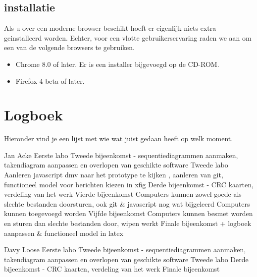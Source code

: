 \documentclass[a4paper,oneside]{report}
\begin{document}
\section{installatie}
Als u over een moderne browser beschikt hoeft er eigenlijk niets extra geinstalleerd worden.
Echter, voor een vlotte gebruikerservaring raden we aan om een van de volgende browsers te gebruiken.
\begin{itemize}
\item Chrome 8.0 of later. Er is een installer bijgevoegd op de CD-ROM.
\item Firefox 4 beta of later.
\end{itemize}


\chapter{Logboek}
Hieronder vind je een lijst met wie wat juist gedaan heeft op welk moment.
\begin{studentlog}{Jan Acke}
{Eerste labo}
{Tweede bijeenkomst - sequentiediagrammen aanmaken, takendiagram aanpassen en overlopen van geschikte software}
{Tweede labo}
{Aanleren javascript dmv naar het prototype te kijken , aanleren van git, functioneel model voor berichten kiezen in xfig}
{Derde bijeenkomst - CRC kaarten, verdeling van het werk}
{Vierde bijeenkomst}
{Computers kunnen zowel goede als slechte bestanden doorsturen, ook git \& javascript nog wat bijgeleerd}
{Computers kunnen toegevoegd worden}
{Vijfde bijeenkomst}
{Computers kunnen besmet worden en sturen dan slechte bestanden door, wipen werkt}
{Finale bijeenkomst + logboek aanpassen \& functioneel model in latex}
\end{studentlog}

\begin{studentlog}{Davy Loose}
{Eerste labo}
{Tweede bijeenkomst - sequentiediagrammen aanmaken, takendiagram aanpassen en overlopen van geschikte software}
{Tweede labo}
{Derde bijeenkomst - CRC kaarten, verdeling van het werk}
{Finale bijeenkomst}
\end{studentlog}
\end{document}
